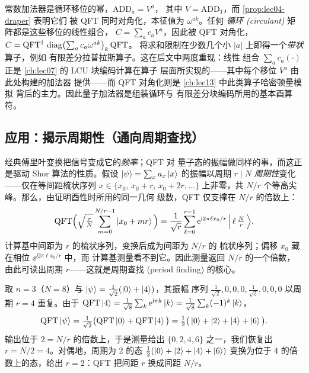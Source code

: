 \begin{remark}
\label{rem:lec04-adder-lcu}
常数加法器是循环移位的幂，$\mathrm{ADD}_a=V^{a}$，
其中 $V=\mathrm{ADD}_1$，而 \cref{prop:lec04-draper} 表明它们
被 QFT 同时对角化，本征值为 $\omega^{ak}$。任何
\emph{循环 (circulant)} 矩阵都是这些移位的线性组合，
$C=\sum_{a}c_a V^{a}$，因此被 QFT 对角化，
$C=\mathrm{QFT}^{\dagger}\,\operatorname{diag}\bigl(\textstyle\sum_a c_a\omega^{ak}\bigr)_{k}\,\mathrm{QFT}$。
将求和限制在少数几个小 $|a|$ 上即得一个\emph{带状}算子，例如
有限差分拉普拉斯算子。这在后文中两度重现：线性
组合 $\sum_a c_a(\cdot)$ 正是 \cref{ch:lec07} 的 LCU 块编码计算在算子
层面所实现的——其中每个移位 $V^a$ 由此处构建的加法器
提供——而 QFT 对角化则是 \cref{ch:lec13} 中此类算子哈密顿量模拟
背后的主力。因此量子加法器是组装循环与
有限差分块编码所用的基本酉算符。
\end{remark}

\subsection*{应用：揭示周期性（通向周期查找）}
\label{sec:lec04-period}

经典傅里叶变换把信号变成它的\emph{频率}；QFT 对
量子态的振幅做同样的事，而这正是驱动
Shor 算法的性质。假设 $\ket{\psi}=\sum_x a_x\ket{x}$ 的振幅以周期
$r\mid N$ \emph{周期性}变化——仅在等间距梳状序列
$x\in\{x_0,\,x_0+r,\,x_0+2r,\dots\}$ 上非零，共 $N/r$ 个等高尖峰。那么，由证明酉性时所用的同一几何
级数，QFT 仅支撑在 $N/r$ 的倍数上：
\[
  \mathrm{QFT}\Big(\sqrt{\tfrac{r}{N}}\sum_{m=0}^{N/r-1}\ket{x_0+mr}\Big)
  =\frac{1}{\sqrt{r}}\sum_{\ell=0}^{r-1}\mathrm{e}^{\mathrm{i} 2\pi \ell x_0/r}\,\Big|\,\ell\,\tfrac{N}{r}\,\Big\rangle .
\]
计算基中间距为 $r$ 的梳状序列，变换后成为间距为 $N/r$ 的
梳状序列；偏移 $x_0$ 藏在相位 $\ee^{\ii 2\pi\ell x_0/r}$ 中，而
计算基测量看不到它。因此测量返回 $N/r$ 的一个倍数，
由此可读出周期 $r$——这就是周期查找 (period finding) 的核心。

\begin{example}
\label{ex:lec04-period}
取 $n=3$（$N=8$）与 $\ket{\psi}=\tfrac1{\sqrt2}(\ket{0}+\ket{4})$，其振幅
序列 $\tfrac1{\sqrt2},0,0,0,\tfrac1{\sqrt2},0,0,0$ 以周期 $r=4$ 重复。由于
$\mathrm{QFT}\ket{4}=\tfrac1{\sqrt8}\sum_k\mathrm{e}^{\mathrm{i}\pi k}\ket{k}=\tfrac1{\sqrt8}\sum_k(-1)^k\ket{k}$，
\[
  \mathrm{QFT}\ket{\psi}=\tfrac1{\sqrt2}\big(\mathrm{QFT}\ket0+\mathrm{QFT}\ket4\big)
  =\tfrac12\big(\ket0+\ket2+\ket4+\ket6\big).
\]
输出位于 $2=N/r$ 的倍数上，于是测量给出
$\{0,2,4,6\}$ 之一，我们恢复出 $r=N/2=4$。对偶地，周期为 $2$ 的态
$\tfrac12(\ket0+\ket2+\ket4+\ket6)$ 变换为位于 $4$ 的倍数上的态，给出
$r=2$：QFT 把间距 $r$ 换成间距 $N/r$。
\end{example}

